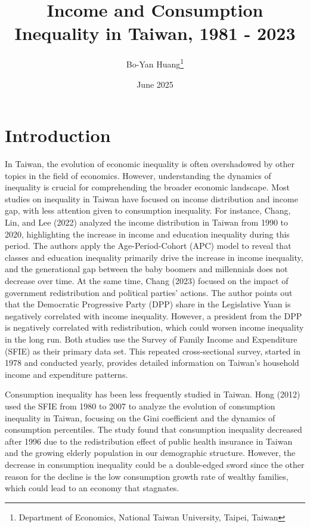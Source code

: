 \documentclass{article}
\title{Income and Consumption Inequality in Taiwan, 1981 - 2023}
\author{Bo-Yan Huang\footnote{Department of Economics, National Taiwan University, Taipei, Taiwan}}
\date{June 2025}
\begin{document}
\maketitle

\section{Introduction}
\label{sec:introduction}

In Taiwan, the evolution of economic inequality is often overshadowed by other topics in the field of economics.
However, understanding the dynamics of inequality is crucial for comprehending the broader economic landscape. 
Most studies on inequality in Taiwan have focused on income distribution and income gap, with less attention given to consumption inequality.
For instance, Chang, Lin, and Lee (2022) analyzed the income distribution in Taiwan from 1990 to 2020, highlighting the increase in income and education inequality during this period.
The authors apply the Age-Period-Cohort (APC) model to reveal that classes and education inequality primarily drive the increase in income inequality, and the generational gap between the baby boomers and millennials does not decrease over time. 
At the same time, Chang (2023) focused on the impact of government redistribution and political parties' actions. 
The author points out that the Democratic Progressive Party (DPP) share in the Legislative Yuan is negatively correlated with income inequality. However, a president from the DPP is negatively correlated with redistribution, which could worsen income inequality in the long run.
Both studies use the Survey of Family Income and Expenditure (SFIE) as their primary data set. This repeated cross-sectional survey, started in 1978 and conducted yearly, provides detailed information on Taiwan's household income and expenditure patterns.

Consumption inequality has been less frequently studied in Taiwan. Hong (2012) used the SFIE from 1980 to 2007 to analyze the evolution of consumption inequality in Taiwan, focusing on the Gini coefficient and the dynamics of consumption percentiles. 
The study found that consumption inequality decreased after 1996 due to the redistribution effect of public health insurance in Taiwan and the growing elderly population in our demographic structure.
However, the decrease in consumption inequality could be a double-edged sword since the other reason for the decline is the low consumption growth rate of wealthy families, which could lead to an economy that stagnates.
\end{document}
